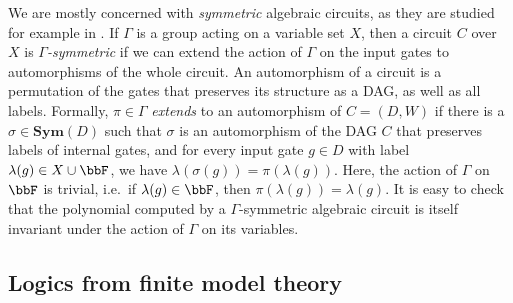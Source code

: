 \documentclass[10pt,a4paper]{article}
\newtheorem{lemma}[theorem]{Lemma}
\newcommand{\Sym}{{\mathbf{Sym}}}
\newcommand{\BigO}{\ensuremath{\mathcal{O}}}
\newcommand{\Field}{\ensuremath{\mathbb{F}}}
\newcommand{\Circ}{C} %
\begin{document}
	
	We are mostly concerned with \emph{symmetric} algebraic circuits, as they are studied for example in \cite{DawarW20}. If $\Gamma$ is a group acting on a variable set $X$, then a circuit $C$ over $X$ is \emph{$\Gamma$-symmetric} if we can extend the action of $\Gamma$ on the input gates
	to automorphisms of the whole circuit.  An automorphism of a circuit is a permutation of the gates that preserves its structure as a DAG, as well as all labels.
	Formally, $\pi \in \Gamma$ \emph{extends} to an automorphism of $C = (D, W)$ if there is a $\sigma \in \Sym(D)$ such that $\sigma$ is an automorphism of the DAG $C$ that preserves labels of internal gates, and for every input gate $g \in D$ with label $\lambda(g) \in X \cup \bbF$, we have $\lambda(\sigma(g)) = \pi(\lambda(g))$. 
	Here, the action of $\Gamma$ on $\bbF$ is trivial, i.e.\ if $\lambda(g) \in \bbF$, then $\pi(\lambda(g)) = \lambda(g)$.
	It is easy to check that the polynomial computed by a $\Gamma$-symmetric algebraic circuit is itself invariant under the action of $\Gamma$ on its variables.

	
	\subsection{Logics from finite model theory}
	\label{sec:logics}
\end{document}
